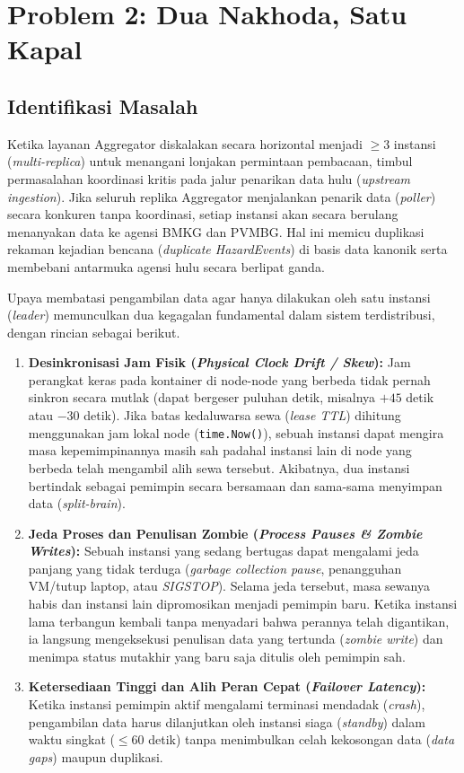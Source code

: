 \clearpage
\section{Problem 2: Dua Nakhoda, Satu Kapal}
\label{sec:problem_2}

\subsection{Identifikasi Masalah}
Ketika layanan Aggregator diskalakan secara horizontal menjadi $\ge 3$ instansi (\textit{multi-replica}) untuk menangani lonjakan permintaan pembacaan, timbul permasalahan koordinasi kritis pada jalur penarikan data hulu (\textit{upstream ingestion}). Jika seluruh replika Aggregator menjalankan penarik data (\textit{poller}) secara konkuren tanpa koordinasi, setiap instansi akan secara berulang menanyakan data ke agensi BMKG dan PVMBG. Hal ini memicu duplikasi rekaman kejadian bencana (\textit{duplicate HazardEvents}) di basis data kanonik serta membebani antarmuka agensi hulu secara berlipat ganda.

\vspace{1em}

\noindent Upaya membatasi pengambilan data agar hanya dilakukan oleh satu instansi (\textit{leader}) memunculkan dua kegagalan fundamental dalam sistem terdistribusi, dengan rincian sebagai berikut.
\begin{enumerate}
    \item \textbf{Desinkronisasi Jam Fisik (\textit{Physical Clock Drift / Skew}):} Jam perangkat keras pada kontainer di node-node yang berbeda tidak pernah sinkron secara mutlak (dapat bergeser puluhan detik, misalnya $+45$ detik atau $-30$ detik). Jika batas kedaluwarsa sewa (\textit{lease TTL}) dihitung menggunakan jam lokal node (\texttt{time.Now()}), sebuah instansi dapat mengira masa kepemimpinannya masih sah padahal instansi lain di node yang berbeda telah mengambil alih sewa tersebut. Akibatnya, dua instansi bertindak sebagai pemimpin secara bersamaan dan sama-sama menyimpan data (\textit{split-brain}).
    \item \textbf{Jeda Proses dan Penulisan Zombie (\textit{Process Pauses \& Zombie Writes}):} Sebuah instansi yang sedang bertugas dapat mengalami jeda panjang yang tidak terduga (\textit{garbage collection pause}, penangguhan VM/tutup laptop, atau \textit{SIGSTOP}). Selama jeda tersebut, masa sewanya habis dan instansi lain dipromosikan menjadi pemimpin baru. Ketika instansi lama terbangun kembali tanpa menyadari bahwa perannya telah digantikan, ia langsung mengeksekusi penulisan data yang tertunda (\textit{zombie write}) dan menimpa status mutakhir yang baru saja ditulis oleh pemimpin sah.
    \item \textbf{Ketersediaan Tinggi dan Alih Peran Cepat (\textit{Failover Latency}):} Ketika instansi pemimpin aktif mengalami terminasi mendadak (\textit{crash}), pengambilan data harus dilanjutkan oleh instansi siaga (\textit{standby}) dalam waktu singkat ($\le 60$ detik) tanpa menimbulkan celah kekosongan data (\textit{data gaps}) maupun duplikasi.
\end{enumerate}

